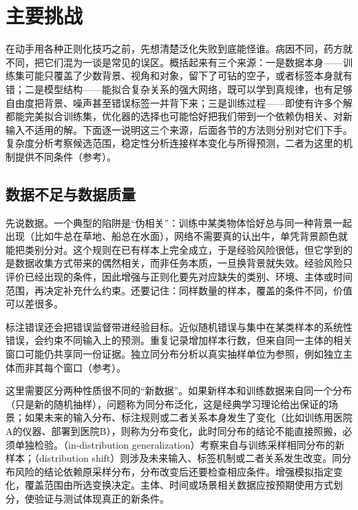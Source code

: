 \section{主要挑战}
\label{sec:generalization-challenges}

在动手用各种正则化技巧之前，先想清楚泛化失败到底能怪谁。病因不同，药方就不同，把它们混为一谈是常见的误区。概括起来有三个来源：一是数据本身——训练集可能只覆盖了少数背景、视角和对象，留下了可钻的空子，或者标签本身就有错；二是模型结构——能拟合复杂关系的强大网络，既可以学到真规律，也有足够自由度把背景、噪声甚至错误标签一并背下来；三是训练过程——即使有许多个解都能完美拟合训练集，优化器的选择也可能恰好把我们带到一个依赖伪相关、对新输入不适用的解。下面逐一说明这三个来源，后面各节的方法则分别对它们下手。复杂度分析考察候选范围，稳定性分析连接样本变化与所得预测，二者为这里的机制提供不同条件（参考）。

\subsection{数据不足与数据质量}
\label{sec:generalization-data-quality}

先说数据。一个典型的陷阱是“伪相关”：训练中某类物体恰好总与同一种背景一起出现（比如牛总在草地、船总在水面），网络不需要真的认出牛，单凭背景颜色就能把类别分对。这个规则在已有样本上完全成立，于是经验风险很低，但它学到的是数据收集方式带来的偶然相关，而非任务本质，一旦换背景就失效。经验风险只评价已经出现的条件，因此增强与正则化要先对应缺失的类别、环境、主体或时间范围，再决定补充什么约束。还要记住：同样数量的样本，覆盖的条件不同，价值可以差很多。

标注错误还会把错误监督带进经验目标。近似随机错误与集中在某类样本的系统性错误，会约束不同输入上的预测。重复记录增加样本行数，但来自同一主体的相关窗口可能仍共享同一份证据。独立同分布分析以真实抽样单位为参照，例如独立主体而非其每个窗口（参考）。

这里需要区分两种性质很不同的“新数据”。如果新样本和训练数据来自同一个分布（只是新的随机抽样），问题称为同分布泛化，这是经典学习理论给出保证的场景；如果未来的输入分布、标注规则或二者关系本身发生了变化（比如训练用医院A的仪器、部署到医院B），则称为分布变化，此时同分布的结论不能直接照搬，必须单独检验。（in-distribution generalization）考察来自与训练采样相同分布的新样本；（distribution shift）则涉及未来输入、标签机制或二者关系发生改变。同分布风险的结论依赖原采样分布，分布改变后还要检查相应条件。增强模拟指定变化，覆盖范围由所选变换决定。主体、时间或场景相关数据应按预期使用方式划分，使验证与测试体现真正的新条件。

